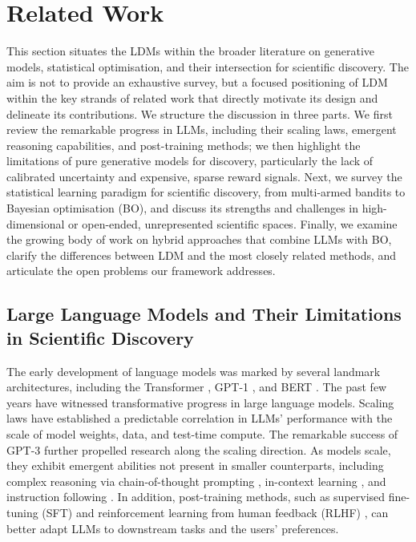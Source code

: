 \section{Related Work}
\label{sec:related}

This section situates the LDMs within the broader literature on generative models, statistical optimisation, and their intersection for scientific discovery. The aim is not to provide an exhaustive survey, but a focused positioning of LDM within the key strands of related work that directly motivate its design and delineate its contributions. We structure the discussion in three parts. We first review the remarkable progress in LLMs, including their scaling laws, emergent reasoning capabilities, and post-training methods; we then highlight the limitations of pure generative models for discovery, particularly the lack of calibrated uncertainty and expensive, sparse reward signals. Next, we survey the statistical learning paradigm for scientific discovery, from multi-armed bandits to Bayesian optimisation (BO), and discuss its strengths and challenges in high-dimensional or open-ended, unrepresented scientific spaces. Finally, we examine the growing body of work on hybrid approaches that combine LLMs with BO, clarify the differences between LDM and the most closely related methods, and articulate the open problems our framework addresses.

\subsection{Large Language Models and Their Limitations in Scientific Discovery}

The early development of language models was marked by several landmark architectures, including the Transformer \citep{vaswaniAttentionAllYou2017}, GPT-1 \citep{radfordImprovingLanguageUnderstanding2018}, and BERT \citep{devlinBERTPretrainingDeep2019}. The past few years have witnessed transformative progress in large language models. Scaling laws \citep{kaplanScalingLawsNeural2020} have established a predictable correlation in LLMs' performance with the scale of model weights, data, and test-time compute. The remarkable success of GPT-3 \citep{brownLanguageModelsAre2020} further propelled research along the scaling direction. As models scale, they exhibit emergent abilities \citep{weiEmergentAbilitiesLarge2022} not present in smaller counterparts, including complex reasoning via chain-of-thought prompting \citep{weiChainofThoughtPromptingElicits2023,kojimaLargeLanguageModels2023}, in-context learning \citep{hanUnderstandingEmergentInContext2025}, and instruction following \citep{ouyangTrainingLanguageModels2022}. In addition, post-training methods, such as supervised fine-tuning (SFT) and reinforcement learning from human feedback (RLHF) \citep{ouyangTrainingLanguageModels2022}, can better adapt LLMs to downstream tasks and the users' preferences.

